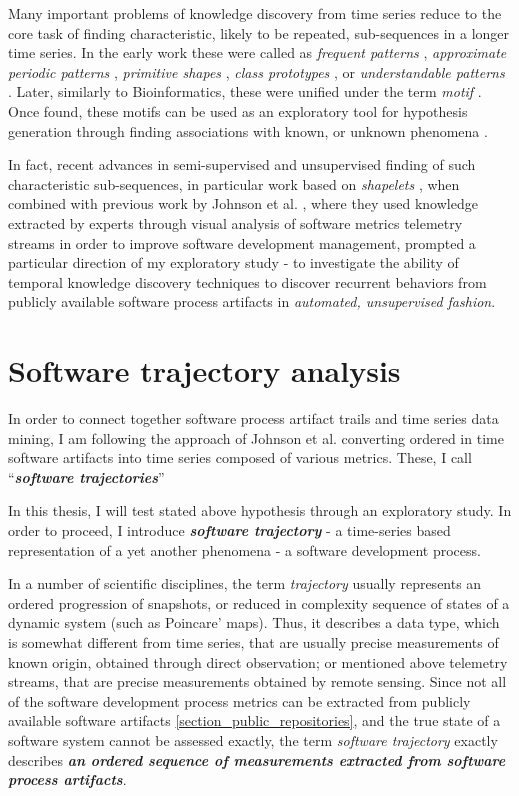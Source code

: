 Many important problems of knowledge discovery from time series reduce to the core task of finding 
characteristic, likely to be repeated, sub-sequences in a longer time series. 
In the early work these were called as 
\textit{frequent patterns} \cite{citeulike:5159615}, 
\textit{approximate periodic patterns} \cite{citeulike:1959582},
\textit{primitive shapes} \cite{citeulike:5898869}, 
\textit{class prototypes} \cite{citeulike:4406444}, 
or \textit{understandable patterns} \cite{citeulike:3978076}. 
Later, similarly to Bioinformatics, these were unified under the term \textit{motif} \cite{citeulike:3977965}.
Once found, these motifs can be used as an exploratory tool for hypothesis generation through finding 
associations with known, or unknown phenomena \cite{citeulike:3977965}.

In fact, recent advances in semi-supervised and unsupervised finding of such characteristic sub-sequences, 
in particular work based on \textit{shapelets} \cite{citeulike:7344347} \cite{citeulike:11957982}
\cite{citeulike:12552293}, when combined with previous work by Johnson et al. \cite{citeulike:12550871}, 
where they used knowledge extracted by experts through visual analysis of software metrics telemetry streams 
in order to improve software development management, prompted a particular direction of my exploratory 
study - to investigate the ability of temporal knowledge discovery techniques to discover recurrent behaviors
from publicly available software process artifacts in \textit{automated, unsupervised fashion}.

\section{Software trajectory analysis}\label{section_trajectory_definition}
In order to connect together software process artifact trails and time series data mining, I am following
the approach of Johnson et al. \cite{citeulike:12550871} converting ordered in time software artifacts into
time series composed of various metrics. These, I call ``\textit{\textbf{software trajectories}}''

In this thesis, I will test stated above hypothesis through an exploratory study. In order to proceed, 
I introduce \textit{\textbf{software trajectory}} - a time-series based representation of a yet another 
phenomena - a software development process. 

In a number of scientific disciplines, the term \textit{trajectory} usually represents 
an ordered progression of snapshots, or reduced in complexity sequence of states of a dynamic 
system (such as Poincare' maps). 
Thus, it describes a data type, which is somewhat different from time series, that are usually precise
measurements of known origin, obtained through direct observation; 
or mentioned above telemetry streams, that are precise measurements obtained by remote 
sensing. Since not all of the software development process metrics can be extracted from publicly 
available software artifacts \ref{section_public_repositories}, and the true state of a software system 
cannot be assessed exactly, the term \textit{software trajectory} exactly describes
\textbf{\textit{an ordered 
sequence of measurements extracted from software process artifacts}}.

